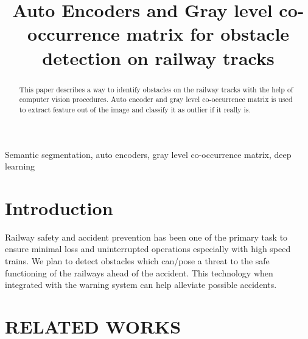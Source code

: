 \documentclass[conference]{IEEEtran}
\begin{document}
\title{Auto Encoders and Gray level co-occurrence matrix for obstacle detection on railway tracks}

\author{
\and
{}
\and
{}
}

\maketitle

\begin{abstract}
This paper describes a way to identify obstacles on the railway tracks with the help of computer vision procedures. Auto encoder and gray level co-occurrence matrix is used to extract feature out of the image and classify it as outlier if it really is.
\end{abstract}

\begin{IEEEkeywords}
Semantic segmentation, auto encoders, gray level co-occurrence matrix, deep learning
\end{IEEEkeywords}

\section{Introduction}
Railway safety and accident prevention has been one of the primary task to ensure minimal loss and uninterrupted operations especially with high speed trains. We plan to detect obstacles which can/pose a threat to the safe functioning of the railways ahead of the accident. This technology when integrated with the warning system can help alleviate possible accidents.

\section{RELATED WORKS}
\end{document}
